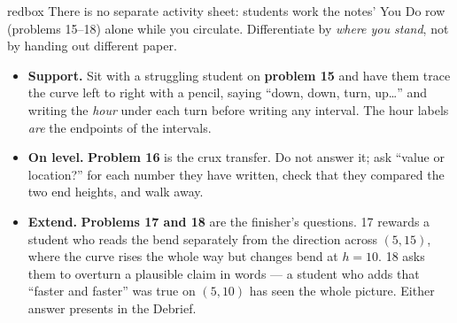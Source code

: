 \documentclass[10pt]{article}
\begin{document}
\begin{skillbox}{redbox}
There is no separate activity sheet: students work the notes' You Do row (problems 15--18)
alone while you circulate. Differentiate by \textit{where you stand}, not by handing out
different paper.

\begin{itemize}
  \item \textbf{Support.} Sit with a struggling student on \textbf{problem 15} and have them
        trace the curve left to right with a pencil, saying ``down, down, turn, up\ldots''
        and writing the \emph{hour} under each turn before writing any interval. The hour
        labels \emph{are} the endpoints of the intervals.
  \item \textbf{On level.} \textbf{Problem 16} is the crux transfer. Do not answer it; ask
        ``value or location?'' for each number they have written, check that they compared
        the two end heights, and walk away.
  \item \textbf{Extend.} \textbf{Problems 17 and 18} are the finisher's questions. 17 rewards a
        student who reads the bend separately from the direction across $(5, 15)$, where the
        curve rises the whole way but changes bend at $h = 10$. 18 asks them to overturn a
        plausible claim in words --- a student who adds that ``faster and faster'' was true on
        $(5, 10)$ has seen the whole picture. Either answer presents in the Debrief.
\end{itemize}
\end{skillbox}
\end{document}
